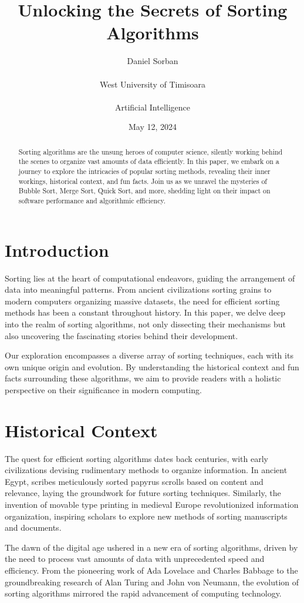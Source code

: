 \documentclass{article}
\title{Unlocking the Secrets of Sorting Algorithms}
\author{Daniel Sorban\\\\
West University of Timisoara\\\\
Artificial Intelligence}
\date{May 12, 2024}
\begin{document}
\maketitle

\begin{abstract}
Sorting algorithms are the unsung heroes of computer science, silently working behind the scenes to organize vast amounts of data efficiently. In this paper, we embark on a journey to explore the intricacies of popular sorting methods, revealing their inner workings, historical context, and fun facts. Join us as we unravel the mysteries of Bubble Sort, Merge Sort, Quick Sort, and more, shedding light on their impact on software performance and algorithmic efficiency.
\end{abstract}

\section{Introduction}
Sorting lies at the heart of computational endeavors, guiding the arrangement of data into meaningful patterns. From ancient civilizations sorting grains to modern computers organizing massive datasets, the need for efficient sorting methods has been a constant throughout history. In this paper, we delve deep into the realm of sorting algorithms, not only dissecting their mechanisms but also uncovering the fascinating stories behind their development.

Our exploration encompasses a diverse array of sorting techniques, each with its own unique origin and evolution. By understanding the historical context and fun facts surrounding these algorithms, we aim to provide readers with a holistic perspective on their significance in modern computing.

\section{Historical Context}
The quest for efficient sorting algorithms dates back centuries, with early civilizations devising rudimentary methods to organize information. In ancient Egypt, scribes meticulously sorted papyrus scrolls based on content and relevance, laying the groundwork for future sorting techniques. Similarly, the invention of movable type printing in medieval Europe revolutionized information organization, inspiring scholars to explore new methods of sorting manuscripts and documents.

The dawn of the digital age ushered in a new era of sorting algorithms, driven by the need to process vast amounts of data with unprecedented speed and efficiency. From the pioneering work of Ada Lovelace and Charles Babbage to the groundbreaking research of Alan Turing and John von Neumann, the evolution of sorting algorithms mirrored the rapid advancement of computing technology.
\end{document}
